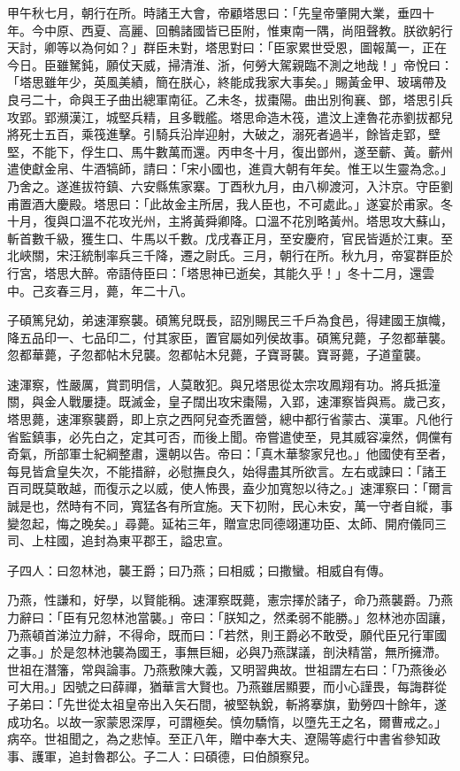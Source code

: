 \begin{pinyinscope}
 甲午秋七月，朝行在所。時諸王大會，帝顧塔思曰：「先皇帝肇開大業，垂四十年。今中原、西夏、高麗、回鶻諸國皆已臣附，惟東南一隅，尚阻聲教。朕欲躬行天討，卿等以為何如？」群臣未對，塔思對曰：「臣家累世受恩，圖報萬一，正在今日。臣雖駑鈍，願仗天威，掃清淮、浙，何勞大駕親臨不測之地哉！」帝悅曰：「塔思雖年少，英風美績，簡在朕心，終能成我家大事矣。」賜黃金甲、玻璃帶及良弓二十，命與王子曲出總軍南征。乙未冬，拔棗陽。曲出別徇襄、鄧，塔思引兵攻郢。郢瀕漢江，城堅兵精，且多戰艦。塔思命造木筏，遣汶上達魯花赤劉拔都兒將死士五百，乘筏進擊。引騎兵沿岸迎射，大破之，溺死者過半，餘皆走郢，壁堅，不能下，俘生口、馬牛數萬而還。丙申冬十月，復出鄧州，遂至蘄、黃。蘄州遣使獻金帛、牛酒犒師，請曰：「宋小國也，進貢大朝有年矣。惟王以生靈為念。」乃舍之。遂進拔符鎮、六安縣焦家寨。丁酉秋九月，由八柳渡河，入汴京。守臣劉甫置酒大慶殿。塔思曰：「此故金主所居，我人臣也，不可處此。」遂宴於甫家。冬十月，復與口溫不花攻光州，主將黃舜卿降。口溫不花別略黃州。塔思攻大蘇山，斬首數千級，獲生口、牛馬以千數。戊戌春正月，至安慶府，官民皆遁於江東。至北峽關，宋汪統制率兵三千降，遷之尉氏。三月，朝行在所。秋九月，帝宴群臣於行宮，塔思大醉。帝語侍臣曰：「塔思神已逝矣，其能久乎！」冬十二月，還雲中。己亥春三月，薨，年二十八。



 子碩篤兒幼，弟速渾察襲。碩篤兒既長，詔別賜民三千戶為食邑，得建國王旗幟，降五品印一、七品印二，付其家臣，置官屬如列侯故事。碩篤兒薨，子忽都華襲。忽都華薨，子忽都帖木兒襲。忽都帖木兒薨，子寶哥襲。寶哥薨，子道童襲。



 速渾察，性嚴厲，賞罰明信，人莫敢犯。與兄塔思從太宗攻鳳翔有功。將兵抵潼關，與金人戰屢捷。既滅金，皇子闊出攻宋棗陽，入郢，速渾察皆與焉。歲己亥，塔思薨，速渾察襲爵，即上京之西阿兒查禿置營，總中都行省蒙古、漢軍。凡他行省監鎮事，必先白之，定其可否，而後上聞。帝嘗遣使至，見其威容凜然，倜儻有奇氣，所部軍士紀綱整肅，還朝以告。帝曰：「真木華黎家兒也。」他國使有至者，每見皆倉皇失次，不能措辭，必慰撫良久，始得盡其所欲言。左右或諫曰：「諸王百司既莫敢越，而復示之以威，使人怖畏，盍少加寬恕以待之。」速渾察曰：「爾言誠是也，然時有不同，寬猛各有所宜施。天下初附，民心未安，萬一守者自縱，事變忽起，悔之晚矣。」尋薨。延祐三年，贈宣忠同德翊運功臣、太師、開府儀同三司、上柱國，追封為東平郡王，謚忠宣。



 子四人：曰忽林池，襲王爵；曰乃燕；曰相威；曰撒蠻。相威自有傳。



 乃燕，性謙和，好學，以賢能稱。速渾察既薨，憲宗擇於諸子，命乃燕襲爵。乃燕力辭曰：「臣有兄忽林池當襲。」帝曰：「朕知之，然柔弱不能勝。」忽林池亦固讓，乃燕頓首涕泣力辭，不得命，既而曰：「若然，則王爵必不敢受，願代臣兄行軍國之事。」於是忽林池襲為國王，事無巨細，必與乃燕謀議，剖決精當，無所擁滯。世祖在潛籓，常與論事。乃燕敷陳大義，又明習典故。世祖謂左右曰：「乃燕後必可大用。」因號之曰薛禪，猶華言大賢也。乃燕雖居顯要，而小心謹畏，每誨群從子弟曰：「先世從太祖皇帝出入矢石間，被堅執銳，斬將搴旗，勤勞四十餘年，遂成功名。以故一家蒙恩深厚，可謂極矣。慎勿驕惰，以墮先王之名，爾曹戒之。」病卒。世祖聞之，為之悲悼。至正八年，贈中奉大夫、遼陽等處行中書省參知政事、護軍，追封魯郡公。子二人：曰碩德，曰伯顏察兒。




\end{pinyinscope}
